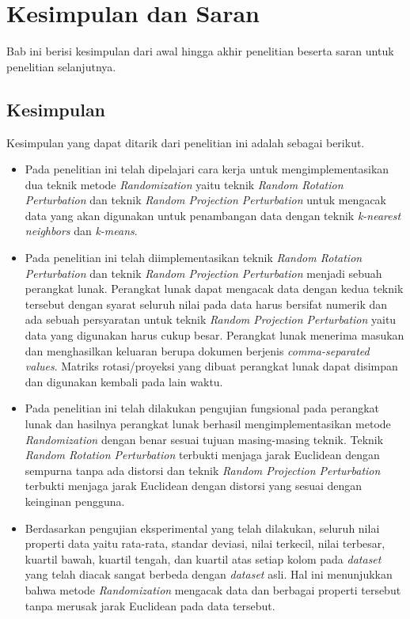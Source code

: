 \chapter{Kesimpulan dan Saran}
\label{chap:kesimpulan-saran}

Bab ini berisi kesimpulan dari awal hingga akhir penelitian beserta saran untuk penelitian selanjutnya.

\section{Kesimpulan}
\label{sec:kesimpulan}

Kesimpulan yang dapat ditarik dari penelitian ini adalah sebagai berikut.
\begin{itemize}
    \item Pada penelitian ini telah dipelajari cara kerja untuk mengimplementasikan dua teknik metode \textit{Randomization} yaitu teknik \textit{Random Rotation Perturbation} dan teknik \textit{Random Projection Perturbation} untuk mengacak data yang akan digunakan untuk penambangan data dengan teknik \textit{k-nearest neighbors} dan \textit{k-means}.
    \item Pada penelitian ini telah diimplementasikan teknik \textit{Random Rotation Perturbation} dan teknik \textit{Random Projection Perturbation} menjadi sebuah perangkat lunak. Perangkat lunak dapat mengacak data dengan kedua teknik tersebut dengan syarat seluruh nilai pada data harus bersifat numerik dan ada sebuah persyaratan untuk teknik \textit{Random Projection Perturbation} yaitu data yang digunakan harus cukup besar. Perangkat lunak menerima masukan dan menghasilkan keluaran berupa dokumen berjenis \textit{comma-separated values}. Matriks rotasi/proyeksi yang dibuat perangkat lunak dapat disimpan dan digunakan kembali pada lain waktu.
    \item Pada penelitian ini telah dilakukan pengujian fungsional pada perangkat lunak dan hasilnya perangkat lunak berhasil mengimplementasikan metode \textit{Randomization} dengan benar sesuai tujuan masing-masing teknik. Teknik \textit{Random Rotation Perturbation} terbukti menjaga jarak Euclidean dengan sempurna tanpa ada distorsi dan teknik \textit{Random Projection Perturbation} terbukti menjaga jarak Euclidean dengan distorsi yang sesuai dengan keinginan pengguna.
    \item Berdasarkan pengujian eksperimental yang telah dilakukan, seluruh nilai properti data yaitu rata-rata, standar deviasi, nilai terkecil, nilai terbesar, kuartil bawah, kuartil tengah, dan kuartil atas setiap kolom pada \textit{dataset} yang telah diacak sangat berbeda dengan \textit{dataset} asli. Hal ini menunjukkan bahwa metode \textit{Randomization} mengacak data dan berbagai properti tersebut tanpa merusak jarak Euclidean pada data tersebut.

\end{itemize}
